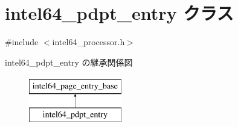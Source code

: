 \hypertarget{classintel64__pdpt__entry}{}\section{intel64\+\_\+pdpt\+\_\+entry クラス}
\label{classintel64__pdpt__entry}


{\ttfamily \#include $<$intel64\+\_\+processor.\+h$>$}

intel64\+\_\+pdpt\+\_\+entry の継承関係図\begin{figure}[H]
\begin{center}
\leavevmode
\includegraphics[height=2.000000cm]{classintel64__pdpt__entry}
\end{center}
\end{figure}
